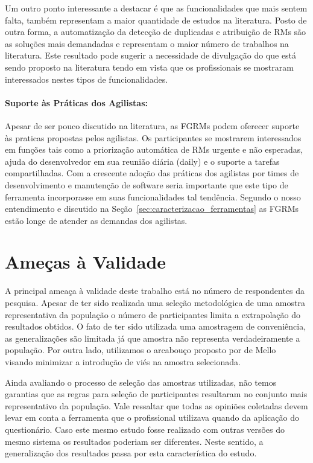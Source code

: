 Um outro ponto interessante a destacar é que as funcionalidades que mais sentem
falta, também representam a maior quantidade de estudos na literatura. Posto de
outra forma, a automatização da detecção de duplicadas e atribuição de RMs são
as soluções mais demandadas e representam o maior número de trabalhos na
literatura. Este resultado pode sugerir a necessidade de divulgação do que está
sendo proposto na literatura tendo em vista que os profissionais se mostraram
interessados nestes tipos de funcionalidades.

\paragraph{Suporte às Práticas dos Agilistas:}
\label{par:pesq_profissionais_suporte_pratica_agilistas}

Apesar de ser pouco discutido na literatura, as FGRMs podem oferecer suporte às
praticas propostas pelos agilistas. Os participantes se mostrarem interessados
em funções tais como a priorização automática de RMs urgente e não esperadas,
ajuda do desenvolvedor em sua reunião diária (daily) e o suporte a tarefas
compartilhadas. Com a crescente adoção das práticas dos agilistas por times de
desenvolvimento e manutenção de software seria importante que este tipo de
ferramenta incorporasse em suas funcionalidades tal tendência. Segundo o nosso
entendimento e discutido na Seção~\ref{sec:caracterizacao_ferramentas} as FGRMs
estão longe de atender as demandas dos agilistas.

\section{Ameças à Validade}
\label{sec:pesquisa_profissionais_ameacas_validade}

A principal ameaça à validade deste trabalho está no número de respondentes da
pesquisa. Apesar de ter sido realizada uma seleção metodológica de uma amostra
representativa da população o número de participantes limita a extrapolação do
resultados obtidos. O fato de ter sido utilizada uma amostragem de conveniência,
as generalizações são limitada já que amostra não representa verdadeiramente a
população. Por outra lado, utilizamos o arcabouço proposto por de
Mello~\cite{de2014towards} visando minimizar a introdução de viés na amostra
selecionada.

Ainda avaliando o processo de seleção das amostras utilizadas, não temos
garantias que as regras para seleção de participantes resultaram no conjunto
mais representativo da população. Vale ressaltar que todas as opiniões coletadas
devem levar em conta a ferramenta que o profissional utilizava quando da
aplicação do questionário.  Caso este mesmo estudo fosse realizado com outras
versões do mesmo sistema os resultados poderiam ser diferentes. Neste sentido, a
generalização dos resultados passa por esta característica do estudo.

